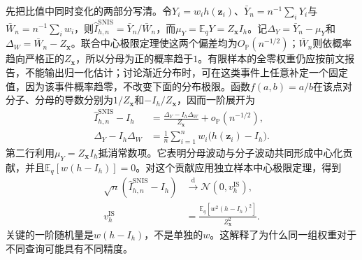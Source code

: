 先把比值中同时变化的两部分写清。令$Y_i=w_i h(\bm z_i)$、$\bar Y_n=n^{-1}\sum_iY_i$与$\bar W_n=n^{-1}\sum_iw_i$，则$\widehat I_{h,n}^{\mathrm{SNIS}}=\bar Y_n/\bar W_n$，而$\mu_Y=\mathbb E_qY=Z_{\bm x}I_h$。记$\Delta_Y=\bar Y_n-\mu_Y$和$\Delta_W=\bar W_n-Z_{\bm x}$。联合中心极限定理使这两个偏差均为$O_{\mathbb P}(n^{-1/2})$；$\bar W_n$则依概率趋向严格正的$Z_{\bm x}$，所以分母为正的概率趋于$1$。有限样本的全零权重仍应按前文报告，不能输出归一化估计；讨论渐近分布时，可在这类事件上任意补定一个固定值，因为该事件概率趋零，不改变下面的分布极限。函数$f(a,b)=a/b$在该点对分子、分母的导数分别为$1/Z_{\bm x}$和$-I_h/Z_{\bm x}$，因而一阶展开为
\[
  \begin{aligned}
    \widehat I_{h,n}^{\mathrm{SNIS}}-I_h
      &=\frac{\Delta_Y-I_h\Delta_W}{Z_{\bm x}}
           +o_{\mathbb P}(n^{-1/2}),\\
    \Delta_Y-I_h\Delta_W
      &=\frac1n\sum_{i=1}^n w_i\bigl(h(\bm z_i)-I_h\bigr).
  \end{aligned}
\]
第二行利用$\mu_Y=Z_{\bm x}I_h$抵消常数项。它表明分母波动与分子波动共同形成中心化贡献，并且$\mathbb E_q[w(h-I_h)]=0$。对这个贡献应用独立样本中心极限定理，得到
\begin{equation}
  \begin{aligned}
    \sqrt n(\widehat I_{h,n}^{\mathrm{SNIS}}-I_h)
       &\xrightarrow{\mathrm{d}}\mathcal{N}(0,v_h^{\mathrm{IS}}),\\
    v_h^{\mathrm{IS}}
       &=\frac{\mathbb{E}_q[w^2(h-I_h)^2]}{Z_{\bm{x}}^2}.
  \end{aligned}
  \label{eq:pgm-sampling-snis-clt}
\end{equation}
关键的一阶随机量是$w(h-I_h)$，不是单独的$w$。这解释了为什么同一组权重对于不同查询可能具有不同精度。

